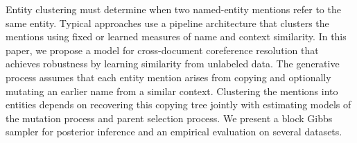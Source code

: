 Entity clustering must determine when two named-entity mentions refer to the same entity. Typical approaches use a pipeline architecture that clusters the mentions using fixed or learned measures of name and context similarity. In this paper, we propose a model for cross-document coreference resolution that achieves robustness by learning similarity from unlabeled data. The generative process assumes that each entity mention arises from copying and optionally mutating an earlier name from a similar context.  Clustering the mentions into entities depends on recovering this copying tree jointly with estimating models of the mutation process and parent selection process.  We present a block Gibbs sampler for posterior inference and an empirical evaluation on several datasets.
